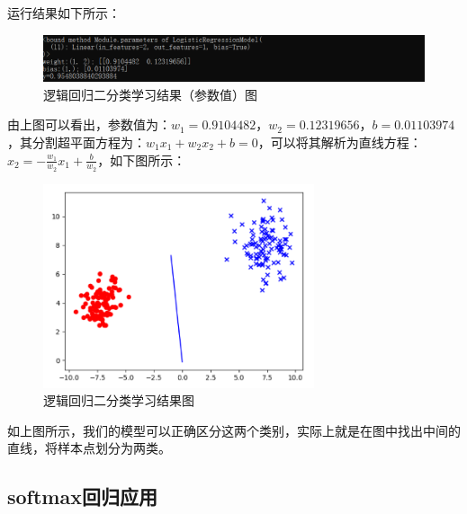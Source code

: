 \documentclass[UTF8]{article}
\begin{document}
运行结果如下所示：\begin{figure}[H]
	\caption{逻辑回归二分类学习结果（参数值）图}
	\label{f000029}
	\centering
	\includegraphics[width=15cm]{images/f000029}
\end{figure}
由上图可以看出，参数值为：$w_{1}=0.9104482$，$w_{2}=0.12319656$，$b=0.01103974$，其分割超平面方程为：$w_{1}x_{1}+w_{2}x_{2} + b=0$，可以将其解析为直线方程：$x_{2}=-\frac{w_{1}}{w_{2}}x_{1} + \frac{b}{w_{2}}$，如下图所示：
\begin{figure}[H]
	\caption{逻辑回归二分类学习结果图}
	\label{f000028}
	\centering
	\includegraphics[height=6cm]{images/f000028}
\end{figure}
如上图所示，我们的模型可以正确区分这两个类别，实际上就是在图中找出中间的直线，将样本点划分为两类。

\subsection{softmax回归应用}
\end{document}
